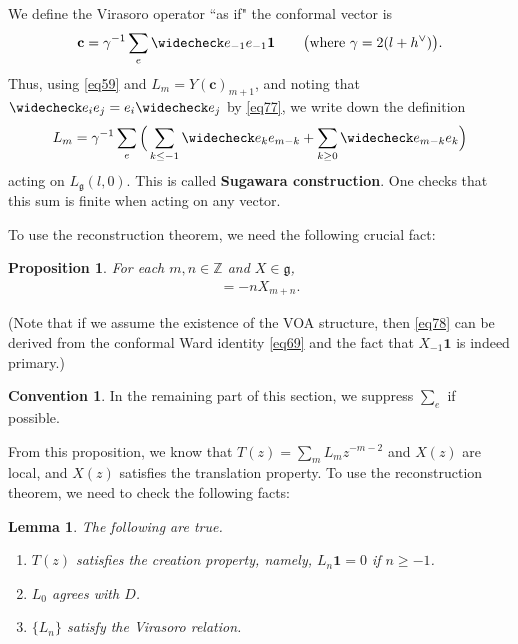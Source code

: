 \documentclass[11pt,b5paper,notitlepage]{article}
\theoremstyle{definition}
\newtheorem{cv}[df]{Convention}
\theoremstyle{plain}
\newtheorem{pp}[df]{Proposition}
\newtheorem{lm}[df]{Lemma}
\newcommand{\wch}{\widecheck}
\newcommand{\id}{\mathbf{1}}
\newcommand{\gk}{\mathfrak g}
\newcommand{\Zbb}{\mathbb Z}
\newcommand{\cbf}{\mathbf c}
\numberwithin{equation}{section}
\begin{document}
\subsection{}

We define the Virasoro operator ``as if" the conformal vector is
\begin{align}
	\cbf=\gamma^{-1}\sum_e\wch e_{-1}e_{-1}\id\qquad\big(\text{where }\gamma=2(l+h^\vee)\big).\label{eq79}
\end{align}
Thus, using \eqref{eq59} and $L_m=Y(\cbf)_{m+1}$, and noting that $\wch e_ie_j=e_i\wch e_j$ by \eqref{eq77}, we write down the definition
\begin{align}
L_m=\gamma^{-1}\sum_e\Big(\sum_{k\leq-1} \wch e_ke_{m-k}+\sum_{k\geq0} \wch e_{m-k}e_k\Big)
\end{align}
acting on $L_\gk(l,0)$. This is called \textbf{Sugawara construction}. One checks that this sum is finite when acting on any vector. 


To use the reconstruction theorem, we need the following crucial fact:
\begin{pp}\label{lb48}
For each $m,n\in\Zbb$ and $X\in\gk$,
\begin{align}
[L_m,X_n]=-nX_{m+n}.	\label{eq78}
\end{align}
\end{pp}
(Note that if we assume the existence of the VOA structure, then \eqref{eq78} can be derived from the conformal Ward identity \eqref{eq69} and the fact that $X_{-1}\id$ is indeed primary.)


\begin{cv}\label{lb49}
In the remaining part of this section, we suppress $\sum_e$ if possible.
\end{cv}
From this proposition, we know that $T(z)=\sum_m L_mz^{-m-2}$ and $X(z)$ are local, and $X(z)$ satisfies the translation property. To use the reconstruction theorem, we need to check the following facts:

\begin{lm}
The following are true.
\begin{enumerate}[label=(\alph*)]
\item $T(z)$ satisfies the creation property, namely, $L_n\id=0$ if $n\geq-1$.
\item $L_0$ agrees with $D$.
\item $\{L_n\}$ satisfy the Virasoro relation.
\end{enumerate}
\end{lm}
\end{document}
